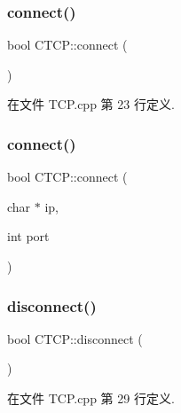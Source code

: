 \mbox{\label{class_c_t_c_p_a0af93bbde343608a81a4772c38bbdfa6}} 
\subsubsection{\texorpdfstring{connect()}{connect()}\hspace{0.1cm}{\footnotesize\ttfamily [1/2]}}
{\footnotesize\ttfamily bool C\+T\+C\+P\+::connect (\begin{DoxyParamCaption}{ }\end{DoxyParamCaption})}



在文件 T\+C\+P.\+cpp 第 23 行定义.

\mbox{\label{class_c_t_c_p_a2437e907d98e436a994c6395f59bf851}} 
\subsubsection{\texorpdfstring{connect()}{connect()}\hspace{0.1cm}{\footnotesize\ttfamily [2/2]}}
{\footnotesize\ttfamily bool C\+T\+C\+P\+::connect (\begin{DoxyParamCaption}\item[{char $\ast$}]{ip,  }\item[{int}]{port }\end{DoxyParamCaption})}

\mbox{\label{class_c_t_c_p_a382a93d27e10a726d0464402e22517b8}} 
\subsubsection{\texorpdfstring{disconnect()}{disconnect()}}
{\footnotesize\ttfamily bool C\+T\+C\+P\+::disconnect (\begin{DoxyParamCaption}{ }\end{DoxyParamCaption})}



在文件 T\+C\+P.\+cpp 第 29 行定义.

\mbox{\label{class_c_t_c_p_aed8fdd632e22efee66dbbb95e951b5c2}} 
